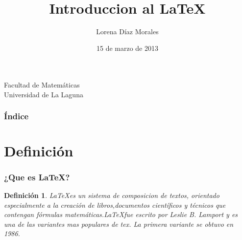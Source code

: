 \documentclass{beamer}
\title[Presentación con Beamer]{Introduccion al \LaTeX{} }
\author[L. Diaz]{Lorena Díaz Morales}
\date[15-03-2013]{15 de marzo de 2013}
\newtheorem{definicion}{Definición}
\begin{document}
  
\begin{frame}


  \begin{scriptsize}
    \begin{center}
     Facultad de Matemáticas \\
     Universidad de La Laguna
    \end{center}
  \end{scriptsize}

\end{frame}

\begin{frame}
  \frametitle{Índice}  
  \tableofcontents[pausesections]
\end{frame}


\section{Definición}

\begin{frame}

\frametitle{¿Que es \LaTeX{}?}

\begin{definicion}
\LaTeX es un sistema de composicion de textos, orientado especialmente a la creación de libros,documentos científicos y técnicos que 
contengan fórmulas matemáticas.\LaTeX fue escrito por Leslie B. Lamport y es una de las variantes mas populares de tex. La primera
variante se obtuvo en 1986.

\end{definicion}

\end{frame}
\end{document}

